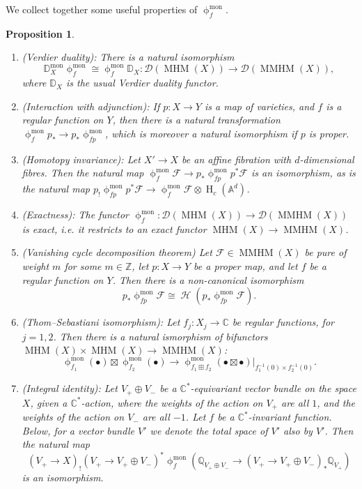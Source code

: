 \documentclass[a4paper,10pt]{amsart}
\renewcommand{\phi}{\upphi}
\newtheorem{proposition}[theorem]{Proposition}
\newcommand{\DD}{\mathbb{D}}
\newcommand{\phim}[1]{\phi^{\mon}_{#1}}
\DeclareMathOperator{\mon}{mon}
\DeclareMathOperator{\MMHM}{MMHM}
\DeclareMathOperator{\MHM}{MHM}
\DeclareMathOperator{\Ho}{\mathcal{H}}
\DeclareMathOperator{\HO}{H}
\newcommand{\Dub}{\mathcal{D}}
\begin{document}
We collect together some useful properties of $\phim{f}$.
\begin{proposition}
\label{basicfacts}
\begin{enumerate}
\item \label{monPD}(Verdier duality): There is a natural isomorphism 
\[
\DD^{\mon}_X\phim{f}\cong \phim{f} \DD_X\colon \Dub(\MHM(X))\rightarrow\Dub(\MMHM(X)), 
\]
where $\DD_X$ is the usual Verdier duality functor.
\item (Interaction with adjunction):\label{adjInt}
If $p\colon X\rightarrow Y$ is a map of varieties, and $f$ is a regular function on $Y$, then there is a natural transformation $\phim{f}p_*\rightarrow p_*\phim{fp}$, which is moreover a natural isomorphism if $p$ is proper.
\item \label{HomInv}(Homotopy invariance): Let $X'\rightarrow X$ be an affine fibration with $d$-dimensional fibres.  Then the natural map $\phim{f} \mathcal{F}\rightarrow p_*\phim{fp}p^*\mathcal{F}$ is an isomorphism, as is the natural map $p_!\phim{fp}p^*\mathcal{F}\rightarrow \phim{f}\mathcal{F}\otimes\HO_c(\mathbb{A}^d)$.
\item\label{exFact}
(Exactness): The functor $\phim{f}\colon \Dub(\MHM(X))\rightarrow\Dub(\MMHM(X))$ is exact, i.e. it restricts to an exact functor $\MHM(X)\rightarrow\MMHM(X)$.
\item (Vanishing cycle decomposition theorem)\label{vanDec}
Let $\mathcal{F}\in\MMHM(X)$ be pure of weight $m$ for some $m\in\mathbb{Z}$, let $p\colon X\rightarrow Y$ be a proper map, and let $f$ be a regular function on $Y$.  Then there is a non-canonical isomorphism
\[
p_*\phim{fp}\mathcal{F}\cong \Ho(p_*\phim{fp}\mathcal{F}).
\]
\item (Thom--Sebastiani isomorphism): Let $f_j\colon X_j\rightarrow\mathbb{C}$ be regular functions, for $j=1,2$.  Then there is a natural ismorphism of bifunctors $\MHM(X)\times\MHM(X)\rightarrow\MMHM(X)$:
\[
\phim{f_1}(\bullet)\boxtimes\phim{f_2}(\bullet)\rightarrow\phim{f_1\boxplus f_2}(\bullet\boxtimes\bullet)|_{f^{-1}_1(0)\times f^{-1}_2(0)}.
\]
\item (Integral identity): Let $V_+\oplus V_-$ be a $\mathbb{C}^*$-equivariant vector bundle on the space $X$, given a $\mathbb{C}^*$-action, where the weights of the action on $V_+$ are all $1$, and the weights of the action on $V_-$ are all $-1$.  Let $f$ be a $\mathbb{C}^*$-invariant function.  Below, for a vector bundle $V'$ we denote the total space of $V'$ also by $V'$.  Then the natural map
\[
(V_+\rightarrow X)_!(V_+\rightarrow V_+\oplus V_-)^*\phim{f}(\mathbb{Q}_{V_+\oplus V_-}\rightarrow (V_+\rightarrow V_+\oplus V_-)_*\mathbb{Q}_{V_+})
\]
is an isomorphism.
\end{enumerate}

\end{proposition}
\end{document}

